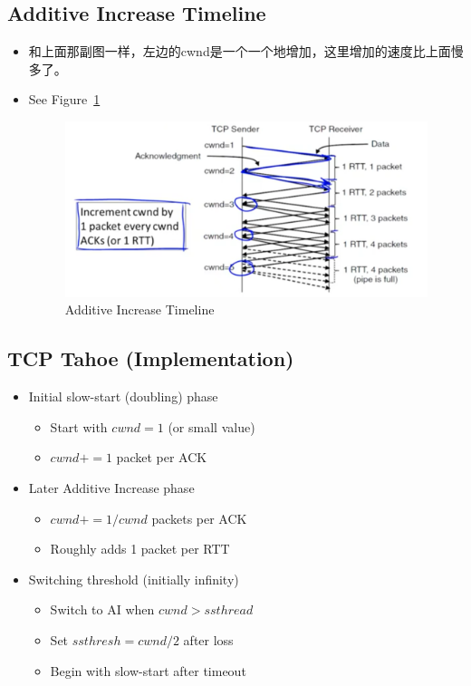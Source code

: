 \documentclass[12pt]{ctexart}   %
\begin{document}
	\subsection{Additive Increase Timeline}
	\begin{itemize}
		\item 和上面那副图一样，左边的cwnd是一个一个地增加，这里增加的速度比上面慢多了。
		\item See Figure~\ref{fig:7-6-5}
		  
		 \begin{figure}[h!] %
		\centering
		 \includegraphics[scale=0.7]{images/7-6-5}
		\caption{ Additive Increase Timeline }
		 \label{fig:7-6-5}
		 \end{figure}
	\end{itemize}
	
	\subsection{TCP Tahoe (Implementation)}
	\begin{itemize}
		\item Initial slow-start (doubling) phase
		\begin{itemize}
			\item Start with $cwnd = 1$ (or small value)
			\item $cwnd +=1$ packet per ACK
		\end{itemize}
		
		\item Later Additive Increase phase
		\begin{itemize}
			\item $ cwnd += 1/cwnd$ packets per ACK
			\item Roughly adds 1 packet per RTT
		\end{itemize}
		
		\item Switching threshold (initially infinity)
		\begin{itemize}
			\item Switch to AI when $ cwnd > ssthread $
			\item Set $ ssthresh = cwnd/2 $ after loss
			\item Begin with slow-start after timeout
		\end{itemize}
	\end{itemize}
	
\end{document}
